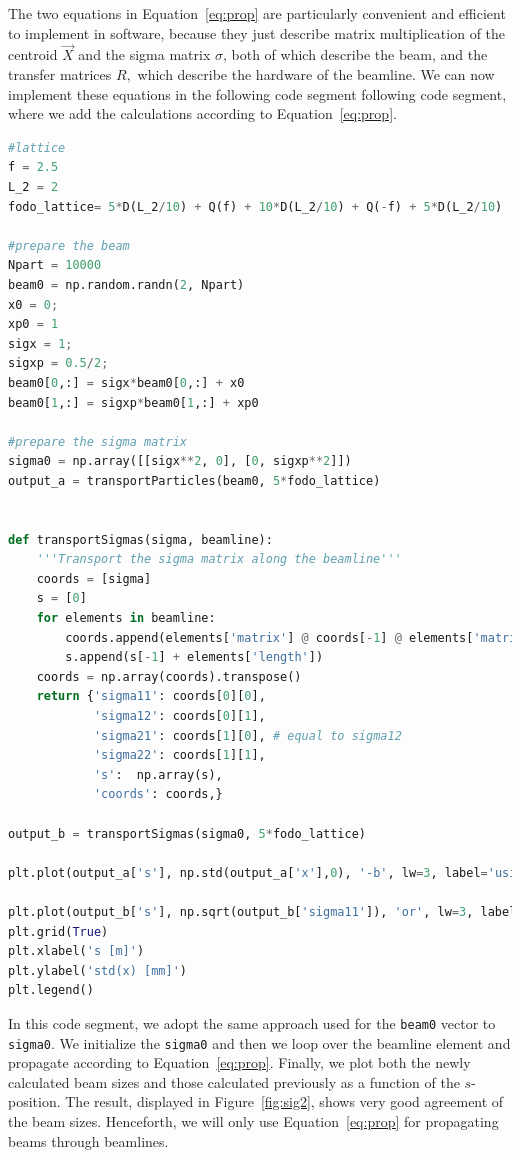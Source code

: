 \documentclass{article}
\begin{document}
The two equations in Equation~\ref{eq:prop} are particularly convenient and efficient to 
implement in software, because they just describe matrix multiplication of the centroid 
$\vec X$ and the sigma matrix $\sigma$, both of which describe the beam, and the transfer 
matrices $R,$ which describe the hardware of the beamline. We can now implement these
equations in the following code segment following code segment, where we add the calculations according to Equation~\ref{eq:prop}.
\begin{lstlisting}[language=Python]
#lattice
f = 2.5
L_2 = 2
fodo_lattice= 5*D(L_2/10) + Q(f) + 10*D(L_2/10) + Q(-f) + 5*D(L_2/10)

#prepare the beam
Npart = 10000
beam0 = np.random.randn(2, Npart)
x0 = 0;
xp0 = 1
sigx = 1; 
sigxp = 0.5/2; 
beam0[0,:] = sigx*beam0[0,:] + x0
beam0[1,:] = sigxp*beam0[1,:] + xp0

#prepare the sigma matrix
sigma0 = np.array([[sigx**2, 0], [0, sigxp**2]])
output_a = transportParticles(beam0, 5*fodo_lattice)


def transportSigmas(sigma, beamline):
    '''Transport the sigma matrix along the beamline'''
    coords = [sigma]
    s = [0]
    for elements in beamline:
        coords.append(elements['matrix'] @ coords[-1] @ elements['matrix'].transpose())
        s.append(s[-1] + elements['length']) 
    coords = np.array(coords).transpose()
    return {'sigma11': coords[0][0],
            'sigma12': coords[0][1],
            'sigma21': coords[1][0], # equal to sigma12
            'sigma22': coords[1][1],
            's':  np.array(s),
            'coords': coords,}

output_b = transportSigmas(sigma0, 5*fodo_lattice)

plt.plot(output_a['s'], np.std(output_a['x'],0), '-b', lw=3, label='using particles tracking')

plt.plot(output_b['s'], np.sqrt(output_b['sigma11']), 'or', lw=3, label='using $\sigma$ matrix tracking')
plt.grid(True)
plt.xlabel('s [m]')
plt.ylabel('std(x) [mm]')
plt.legend()
\end{lstlisting}
In this code segment, we adopt the same approach used for the {\tt beam0} vector to \texttt{sigma0}. We initialize the
{\tt sigma0} and then we loop
over the beamline element and propagate according to Equation~\ref{eq:prop}. 
Finally, we plot both the newly calculated beam sizes and those
calculated previously as a function of the $s$-position. The result, displayed in 
Figure~\ref{fig:sig2}, shows very good agreement of the beam sizes. Henceforth, we
will only use Equation~\ref{eq:prop} for propagating beams through beamlines.
\end{document}
